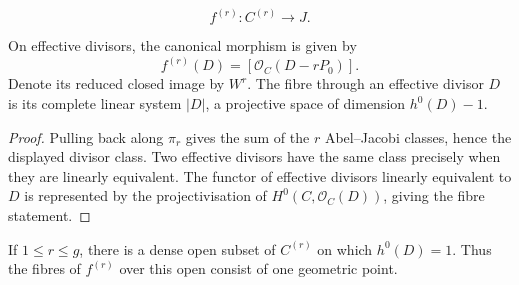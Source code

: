 \begin{definition}
  \label{mk-def:symmetric_product_to_jacobian_morphism}

  \[
    f^{(r)}\colon C^{(r)}\longrightarrow J.
  \]
\end{definition}

\begin{lemma}
  \label{mk-lem:symmetric_product_to_jacobian_formula}

  On effective divisors, the canonical morphism is given by
  \[
    f^{(r)}(D)=[\mathcal O_C(D-rP_0)].
  \]
  Denote its reduced closed image by \(W^r\).  The fibre through an
  effective divisor \(D\) is its complete linear system \(|D|\), a projective
  space of dimension \(h^0(D)-1\).
\end{lemma}

\begin{proof}
  Pulling back along \(\pi_r\) gives the sum of the \(r\) Abel--Jacobi
  classes, hence the displayed divisor class.  Two effective divisors have
  the same class precisely when they are linearly equivalent.  The functor
  of effective divisors linearly equivalent to \(D\) is represented by the
  projectivisation of \(H^0(C,\mathcal O_C(D))\), giving the fibre statement.
\end{proof}

\begin{lemma}
  \label{mk-lem:symmetric_product_general_divisor}

  If \(1\le r\le g\), there is a dense open subset of \(C^{(r)}\) on which
  \(h^0(D)=1\).  Thus the fibres of \(f^{(r)}\) over this open consist of one
  geometric point.
\end{lemma}

